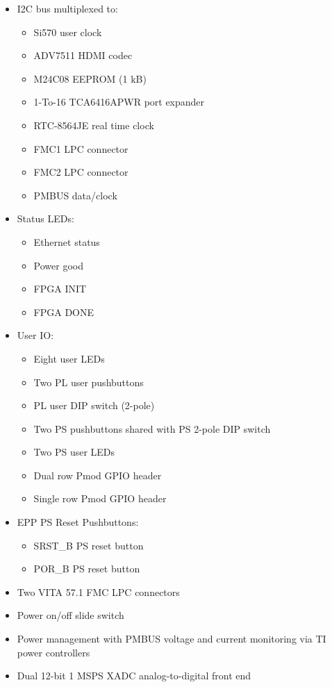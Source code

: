\begin{itemize}
    \item \gls{I2C} bus multiplexed to:
    \begin{itemize}
        \item Si570 user clock
        \item ADV7511 \gls{HDMI} codec
        \item M24C08 \gls{EEPROM} (1 kB)
        \item 1-To-16 TCA6416APWR port expander
        \item RTC-8564JE real time clock
        \item FMC1 LPC connector
        \item FMC2 LPC connector
        \item \gls{PMBUS} data/clock
    \end{itemize}
    \item Status \glspl{LED}:
    \begin{itemize}
        \item Ethernet status
        \item Power good
        \item FPGA INIT
        \item FPGA DONE
    \end{itemize}
    \item User \gls{IO}:
    \begin{itemize}
        \item Eight user \glspl{LED}
        \item Two \gls{PL} user pushbuttons
        \item \gls{PL} user \gls{DIP} switch (2-pole)
        \item Two \gls{PS} pushbuttons shared with \gls{PS} 2-pole \gls{DIP}
            switch
        \item Two \gls{PS} user \glspl{LED}
        \item Dual row Pmod \gls{GPIO} header
        \item Single row Pmod \gls{GPIO} header
    \end{itemize}
    \item \gls{EPP} \gls{PS} Reset Pushbuttons:
    \begin{itemize}
        \item SRST\_B \gls{PS} reset button
        \item POR\_B \gls{PS} reset button
    \end{itemize}
    \item Two VITA 57.1 FMC LPC connectors
    \item Power on/off slide switch
    \item Power management with \gls{PMBUS} voltage and current monitoring via
        TI power controllers
    \item Dual 12-bit 1 MSPS XADC analog-to-digital front end
    

\end{itemize}
